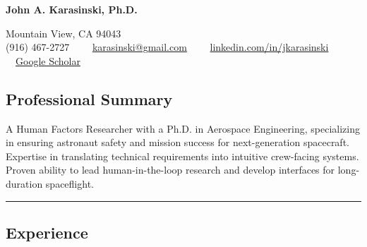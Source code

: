 \documentclass[10pt,letterpaper]{article}
\newenvironment{indentsection}[1]%
{\begin{list}{}%
	{\setlength{\leftmargin}{#1}}%
	\item[]%
}
{\end{list}}
\begin{document}
\begin{center}
	{\LARGE \textbf{John A. Karasinski, Ph.D.}}

	Mountain View, CA 94043
	\\
	(916) 467-2727\ \ \textbullet
	\ \ \href{mailto:karasinski@gmail.com}{karasinski@gmail.com}\ \ \textbullet
	\ \ \href{https://www.linkedin.com/in/jkarasinski/}{linkedin.com/in/jkarasinski}\ \ \textbullet
	\ \ \href{https://scholar.google.com/citations?user=06yynpAAAAAJ&hl=en}{Google Scholar}
\end{center}

\vspace{-0.5em}
\subsection*{Professional Summary}
\begin{indentsection}{\parindent}
    A Human Factors Researcher with a Ph.D. in Aerospace Engineering, specializing in ensuring astronaut safety and mission success for next-generation spacecraft. Expertise in translating technical requirements into intuitive crew-facing systems. Proven ability to lead human-in-the-loop research and develop interfaces for long-duration spaceflight.
\end{indentsection}

\hrule
\vspace{-0.5em}
\subsection*{Experience}
\end{document}
